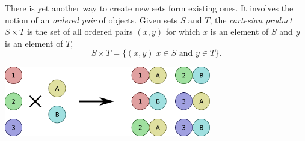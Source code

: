 There is yet another way to create new sets form existing ones.
It involves the notion of an \emph{ordered pair} of objects.
Given sets $S$ and $T$, the \emph{cartesian product} $S \times T$ is the set of all ordered pairs $(x, y)$ for which $x$ is an element of $S$ and $y$ is an element of $T$,
\begin{equation*}
S \times T = \{ (x, y) | x \in S \text{ and } y \in T \} .
\end{equation*}

\begin{center}
\includegraphics[height=3.06cm]{Figures/1Chapter/cartesianproduct}
\end{center}

